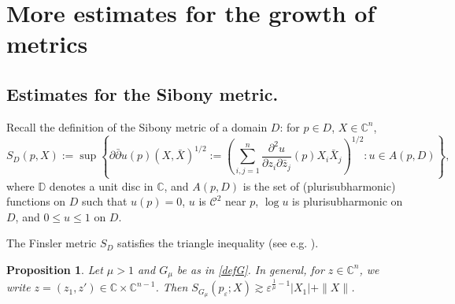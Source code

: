 \documentclass[a4paper,12pt]{amsart}
\def\D{\mathbb D}
\def\C{\mathbb C}
\newtheorem{prop}[thm]{Proposition}
\newcommand{\eps}{\varepsilon}
\begin{document}
\section{More estimates for the growth of metrics}
\label{more}



\subsection{Estimates for the Sibony metric.}

Recall the definition of the Sibony metric of a domain $D$: for $p\in D$, $X\in \C^n$,
\[
S_D(p,X):=\sup\left\{ \partial\bar\partial u(p)(X, \bar X)^{1/2}
:=\left(\sum_{i,j=1}^n\frac{\partial^2 u}{\partial z_i\partial \bar z_j}(p) X_i\bar X_j\right)^{1/2}: u\in A(p,D)\right\},
\]
where $\D$ denotes a unit disc in $\C$, and $A(p,D)$ is the set of (plurisubharmonic) functions on $D$ such that  
$u(p)=0$, $u$ is $\mathcal C^2$ near $p$, $\log u$ is plurisubharmonic on $D$, and $0\le u\le 1$ on $D$. 

The Finsler metric $S_D$ satisfies the triangle inequality (see e.g. \cite[Lemma 2]{FL}).

\begin{prop}
\label{sib}
Let $\mu>1$ and $G_\mu$ be as in \eqref{defG}.
In general, for $z\in \C^n$, we write $z=(z_1,z') \in \C \times \C^{n-1}$.
Then $S_{G_\mu}(p_\eps; X)
\gtrsim \eps^{\frac1\mu -1} |X_1| + \|X\|$.
\end{prop}
\end{document}
